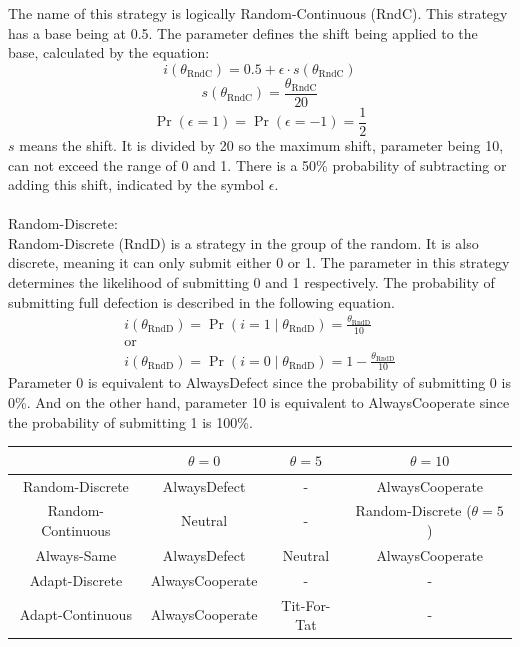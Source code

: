\documentclass{article}
\begin{document}
\begin{itemize}
The name of this strategy is logically Random-Continuous (RndC).
This strategy has a base being at 0.5.
The parameter defines the shift being applied to the base, calculated by the equation:
$$i(\theta_{\mathrm{RndC}}) = 0.5 + \epsilon \cdot s(\theta_{\mathrm{RndC}})$$
$$s(\theta_{\mathrm{RndC}}) = \frac{\theta_{\mathrm{RndC}}}{20}$$
$$\Pr(\epsilon = 1) = \Pr(\epsilon = -1) = \frac{1}{2}$$
$s$ means the shift.
It is divided by 20 so the maximum shift, parameter being 10, can not exceed the range of 0 and 1.
There is a 50\% probability of subtracting or adding this shift, indicated by the symbol $\epsilon$.\\
		\\Random-Discrete:\\
Random-Discrete (RndD) is a strategy in the group of the random.
It is also discrete, meaning it can only submit either 0 or 1.
The parameter in this strategy determines the likelihood of submitting 0 and 1 respectively.
The probability of submitting full defection is described in the following equation.
$$
\begin{array}{c}
i(\theta_{\mathrm{RndD}}) = \Pr(i = 1 \mid \theta_{\mathrm{RndD}}) = \frac{\theta_{\mathrm{RndD}}}{10}\\
\mathrm{or}\\
i(\theta_{\mathrm{RndD}}) = \Pr(i = 0 \mid \theta_{\mathrm{RndD}}) = 1 - \frac{\theta_{\mathrm{RndD}}}{10}
\end{array}
$$
Parameter 0 is equivalent to AlwaysDefect since the probability of submitting 0 is 0\%.
And on the other hand, parameter 10 is equivalent to AlwaysCooperate since the probability of submitting 1 is 100\%.\\

\begin{center}
\begin{tabular}{ c|c|c|c }
   & $\theta = 0$ & $\theta = 5$ & $\theta = 10$ \\ 
   \hline
	Random-Discrete & AlwaysDefect & - & AlwaysCooperate \\  
   \hline
	Random-Continuous & Neutral & - & Random-Discrete ($\theta = 5$) \\
   \hline
	Always-Same & AlwaysDefect & Neutral & AlwaysCooperate \\
   \hline
	Adapt-Discrete & AlwaysCooperate & - & -\\
   \hline
	Adapt-Continuous & AlwaysCooperate & Tit-For-Tat & -
\end{tabular}
\end{center}


\end{itemize}
\end{document}
